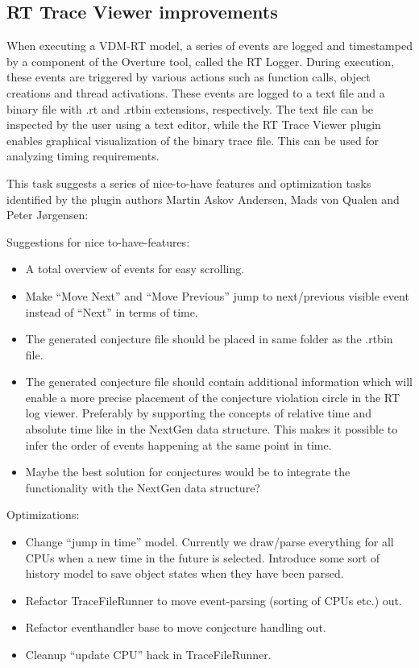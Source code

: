 \documentclass[11pt]{report}
\begin{document}
\subsection*{RT Trace Viewer improvements}

When executing a VDM-RT model, a series of events are logged and timestamped by a component of the Overture tool, called the RT Logger. During execution, these events are triggered by various actions such as function calls, object creations and thread activations. These events are logged to a text file and a binary file with .rt and .rtbin extensions, respectively. The text file can be inspected by the user using a text editor, while the RT Trace Viewer plugin enables graphical visualization of the binary trace file. This can be used for analyzing timing requirements.

This task suggests a series of nice-to-have features and optimization tasks identified by the plugin authors Martin Askov Andersen, Mads von Qualen and Peter J\o rgensen:

Suggestions for nice to-have-features:
\begin{itemize}
\item A total overview of events for easy scrolling.
\item Make ``Move Next'' and ``Move Previous'' jump to next/previous visible event instead of ``Next'' in terms of time.
\item The generated conjecture file should be placed in same folder as the .rtbin file.
\item The generated conjecture file should contain additional information which will enable a more precise placement of the conjecture violation circle in the RT log viewer. Preferably by supporting the concepts of relative time and absolute time like in the NextGen data structure. This makes it possible to infer the order of events happening at the same point in time.
\item Maybe the best solution for conjectures would be to integrate the functionality with the NextGen data structure?
\end{itemize}

Optimizations:

\begin{itemize}
\item Change ``jump in time'' model. Currently we draw/parse everything for all CPUs when a new time in the future is selected. Introduce some sort of history model to save object states when they have been parsed. 
\item Refactor TraceFileRunner to move event-parsing (sorting of CPUs etc.) out.
\item Refactor eventhandler base to move conjecture handling out.
\item Cleanup ``update CPU'' hack in TraceFileRunner.
\end{itemize}
\end{document}
